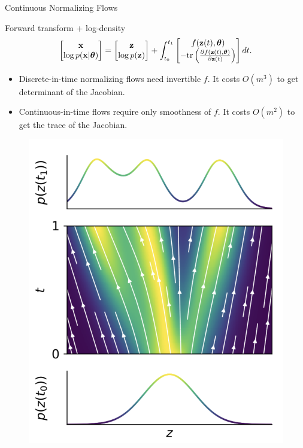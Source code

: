 \begin{frame}{Continuous Normalizing Flows}
	\vspace{-0.5cm}
	\begin{block}{Forward transform + log-density}
		\vspace{-0.5cm}
		\[
			\begin{bmatrix}
				\mathbf{x} \\
				\log p(\mathbf{x} | \boldsymbol{\theta})
			\end{bmatrix}
			= 
			\begin{bmatrix}
				\mathbf{z} \\
				\log p(\mathbf{z})
			\end{bmatrix} + 
			\int_{t_0}^{t_1} 
			\begin{bmatrix}
				f(\mathbf{z}(t), \boldsymbol{\theta}) \\
				- \text{tr} \left( \frac{\partial f(\mathbf{z}(t), \boldsymbol{\theta})}{\partial \mathbf{z}(t)} \right) 
			\end{bmatrix} dt.
		\]
		\vspace{-0.4cm}
	\end{block}
	\begin{itemize}
		\item Discrete-in-time normalizing flows need invertible $f$. It costs $O(m^3)$ to get determinant of the Jacobian.
		\item Continuous-in-time flows require only smoothness of $f$. It costs $O(m^2)$ to get the trace of the Jacobian.
	\end{itemize}
	\vspace{-0.5cm}
	\begin{minipage}[t]{0.4\columnwidth}
		\begin{figure}
			\centering
			\includegraphics[width=0.75\linewidth]{figs/cnf_flow.png}

\end{figure}
\end{minipage}
\end{frame}
